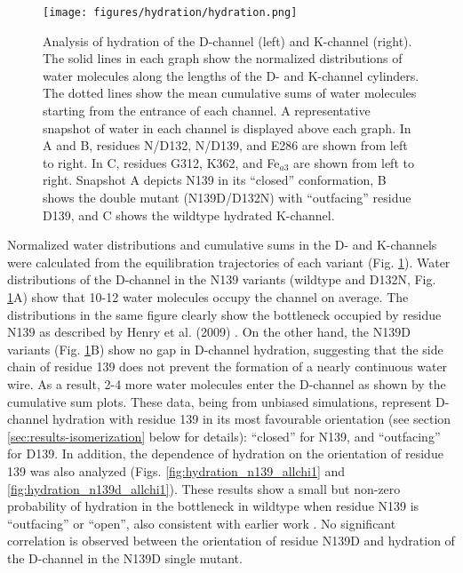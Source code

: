 \begin{figure}[htbp]
\centering
\texttt{[image: figures/hydration/hydration.png]}
\caption[Analysis of hydration of the D-channel and K-channel.]{Analysis of hydration of the D-channel (left) and K-channel (right). The solid lines in each graph show the normalized distributions of water molecules along the lengths of the D- and K-channel cylinders. The dotted lines show the mean cumulative sums of water molecules starting from the entrance of each channel. A representative snapshot of water in each channel is displayed above each graph. In A and B, residues N/D132, N/D139, and E286 are shown from left to right. In C, residues G312, K362, and Fe$_{a3}$ are shown from left to right. Snapshot A depicts N139 in its ``closed'' conformation, B shows the double mutant (N139D/D132N) with ``outfacing'' residue D139, and C shows the wildtype hydrated K-channel.}
\label{fig:hydration}
\end{figure}

Normalized water distributions and cumulative sums in the D- and K-channels were calculated from the equilibration trajectories of each variant (Fig. \ref{fig:hydration}). Water distributions of the D-channel in the N139 variants (wildtype and D132N, Fig. \ref{fig:hydration}A) show that 10-12 water molecules occupy the channel on average. The distributions in the same figure clearly show the bottleneck occupied by residue N139 as described by Henry et al. (2009) \cite{Henry:2009p4543}. On the other hand, the N139D variants (Fig. \ref{fig:hydration}B) show no gap in D-channel hydration, suggesting that the side chain of residue 139 does not prevent the formation of a nearly continuous water wire. As a result, 2-4 more water molecules enter the D-channel as shown by the cumulative sum plots. These data, being from unbiased simulations, represent D-channel hydration with residue 139 in its most favourable orientation (see section \ref{sec:results-isomerization} below for details): ``closed'' for N139, and ``outfacing'' for D139. In addition, the dependence of hydration on the orientation of residue 139 was also analyzed (Figs. \ref{fig:hydration_n139_allchi1} and \ref{fig:hydration_n139d_allchi1}). These results show a small but non-zero probability of hydration in the bottleneck in wildtype when residue N139 is ``outfacing'' or ``open'', also consistent with earlier work \cite{Henry:2009p4543}. No significant correlation is observed between the orientation of residue N139D and hydration of the D-channel in the N139D single mutant.

